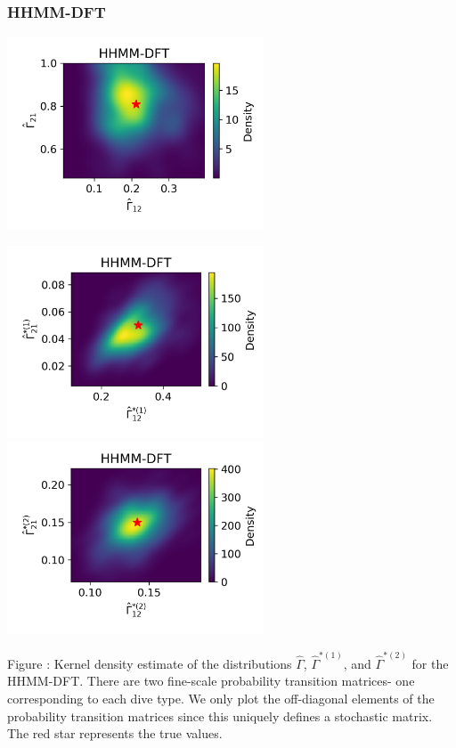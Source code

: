 \documentclass{article}
\begin{document}
        \newpage
        \subsubsection{HHMM-DFT}
        \begin{center}
        \includegraphics[width=3in]{../Plots/hhmm_FV_uncorr_Gamma_density_-1.png}
        
        \includegraphics[width=3in]{../Plots/hhmm_FV_uncorr_Gamma_density_0.png}
        \includegraphics[width=3in]{../Plots/hhmm_FV_uncorr_Gamma_density_1.png}
        \end{center}
        
        \noindent Figure : Kernel density estimate of the distributions $\hat \Gamma$, $\hat \Gamma^{*(1)}$, and $\hat \Gamma^{*(2)}$ for the HHMM-DFT. There are two fine-scale probability transition matrices- one corresponding to each dive type. We only plot the off-diagonal elements of the probability transition matrices since this uniquely defines a stochastic matrix. The red star represents the true values.
        \addtocounter{fignum}{1}
        
\end{document}
